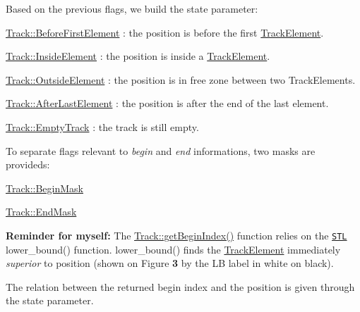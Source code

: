 Based on the previous flags, we build the {\ttfamily state} parameter\-:
\begin{DoxyItemize}
\item \hyperlink{classKite_1_1Track_af4bdc8469c0fee386fc2ff30e0666bcaa5c7f72d6942ae38d66f530bea1063adf}{Track\-::\-Before\-First\-Element} \-: the {\ttfamily position} is before the first \hyperlink{classKite_1_1TrackElement}{Track\-Element}.
\item \hyperlink{classKite_1_1Track_af4bdc8469c0fee386fc2ff30e0666bcaa36e625d718c74f5ff503638360ba1166}{Track\-::\-Inside\-Element} \-: the {\ttfamily position} is inside a \hyperlink{classKite_1_1TrackElement}{Track\-Element}.
\item \hyperlink{classKite_1_1Track_af4bdc8469c0fee386fc2ff30e0666bcaa55d08f66f21334eb8c0dca170f1cb8a4}{Track\-::\-Outside\-Element} \-: the {\ttfamily position} is in free zone between two Track\-Elements.
\item \hyperlink{classKite_1_1Track_af4bdc8469c0fee386fc2ff30e0666bcaa3fc579452c9779cd2865d5019a61c6a5}{Track\-::\-After\-Last\-Element} \-: the position is after the end of the last element.
\item \hyperlink{classKite_1_1Track_af4bdc8469c0fee386fc2ff30e0666bcaaa697b71e325cea0980e9555654f8f3cf}{Track\-::\-Empty\-Track} \-: the track is still empty.
\end{DoxyItemize}

To separate flags relevant to {\itshape begin} and {\itshape end} informations, two masks are provideds\-:
\begin{DoxyItemize}
\item \hyperlink{classKite_1_1Track_af4bdc8469c0fee386fc2ff30e0666bcaa8621fa6a5b7a491fd1bf8dd7f0dd3589}{Track\-::\-Begin\-Mask}
\item \hyperlink{classKite_1_1Track_af4bdc8469c0fee386fc2ff30e0666bcaa0b5a81972d3a6718c3d68199467d2d11}{Track\-::\-End\-Mask}
\end{DoxyItemize}

 {\bfseries Reminder for myself\-:} The \hyperlink{classKite_1_1Track_a7386d7acfcd1dfbeb906bd4c482d797e}{Track\-::get\-Begin\-Index()} function relies on the \href{http://www.sgi.com/tech/stl/}{\tt S\-T\-L} {\ttfamily lower\-\_\-bound()} function. {\ttfamily lower\-\_\-bound()} finds the \hyperlink{classKite_1_1TrackElement}{Track\-Element} immediately {\itshape superior} to {\ttfamily position} (shown on Figure {\bfseries 3} by the {\ttfamily L\-B} label in white on black).

The relation between the returned {\ttfamily begin} index and the position is given through the {\ttfamily state} parameter. 

